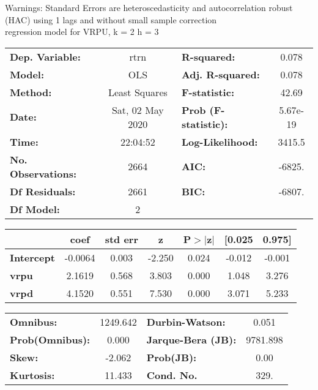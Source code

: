 Warnings: \newline
 [1] Standard Errors are heteroscedasticity and autocorrelation robust (HAC) using 1 lags and without small sample correction\\ 

regression model for VRPU, k = 2 h = 3\begin{center}
\begin{tabular}{lclc}
\toprule
\textbf{Dep. Variable:}    &       rtrn       & \textbf{  R-squared:         } &     0.078   \\
\textbf{Model:}            &       OLS        & \textbf{  Adj. R-squared:    } &     0.078   \\
\textbf{Method:}           &  Least Squares   & \textbf{  F-statistic:       } &     42.69   \\
\textbf{Date:}             & Sat, 02 May 2020 & \textbf{  Prob (F-statistic):} &  5.67e-19   \\
\textbf{Time:}             &     22:04:52     & \textbf{  Log-Likelihood:    } &    3415.5   \\
\textbf{No. Observations:} &        2664      & \textbf{  AIC:               } &    -6825.   \\
\textbf{Df Residuals:}     &        2661      & \textbf{  BIC:               } &    -6807.   \\
\textbf{Df Model:}         &           2      & \textbf{                     } &             \\
\bottomrule
\end{tabular}
\begin{tabular}{lcccccc}
                   & \textbf{coef} & \textbf{std err} & \textbf{z} & \textbf{P$> |$z$|$} & \textbf{[0.025} & \textbf{0.975]}  \\
\midrule
\textbf{Intercept} &      -0.0064  &        0.003     &    -2.250  &         0.024        &       -0.012    &       -0.001     \\
\textbf{vrpu}      &       2.1619  &        0.568     &     3.803  &         0.000        &        1.048    &        3.276     \\
\textbf{vrpd}      &       4.1520  &        0.551     &     7.530  &         0.000        &        3.071    &        5.233     \\
\bottomrule
\end{tabular}
\begin{tabular}{lclc}
\textbf{Omnibus:}       & 1249.642 & \textbf{  Durbin-Watson:     } &    0.051  \\
\textbf{Prob(Omnibus):} &   0.000  & \textbf{  Jarque-Bera (JB):  } & 9781.898  \\
\textbf{Skew:}          &  -2.062  & \textbf{  Prob(JB):          } &     0.00  \\
\textbf{Kurtosis:}      &  11.433  & \textbf{  Cond. No.          } &     329.  \\
\bottomrule
\end{tabular}
\end{center}

